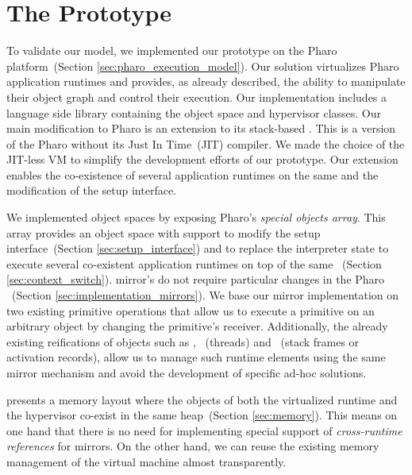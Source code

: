 
\chapter{The \Vtt Prototype}
\minitoc
{}
\introduction

To validate our model, we implemented our \Vtt prototype on the Pharo platform~(Section \ref{sec:pharo_execution_model}). Our solution virtualizes Pharo application runtimes and provides, as already described, the ability to manipulate their object graph and control their execution. Our implementation includes a language side library containing the object space and hypervisor classes. Our main modification to Pharo is an extension to its stack-based \VM. This \VM is a version of the Pharo \VM without its Just In Time~(JIT) compiler. We made the choice of the JIT-less VM to simplify the development efforts of our prototype. Our extension enables the co-existence of several application runtimes on the same \VM and the modification of the \VM setup interface.

We implemented object spaces by exposing Pharo's \emph{special objects array}. This array provides an object space with support to modify the \VM setup interface~(Section \ref{sec:setup_interface}) and to replace the \VM interpreter state to execute several co-existent application runtimes on top of the same \VM~(Section \ref{sec:context_switch}). \Vtt mirror's do not require particular changes in the Pharo \VM~(Section \ref{sec:implementation_mirrors}). We base our mirror implementation on two existing \VM primitive operations that allow us to execute a primitive on an arbitrary object by changing the primitive's receiver. Additionally, the already existing reifications of objects such as , ~(threads) and ~(stack frames or activation records), allow us to manage such runtime elements using the same mirror mechanism and avoid the development of specific ad-hoc solutions.

\Vtt presents a memory layout where the objects of both the virtualized runtime and the hypervisor co-exist in the same heap~(Section \ref{sec:memory}). This means on one hand that there is no need for implementing special support of \emph{cross-runtime references} for mirrors. On the other hand, we can reuse the existing memory management of the virtual machine almost transparently.

